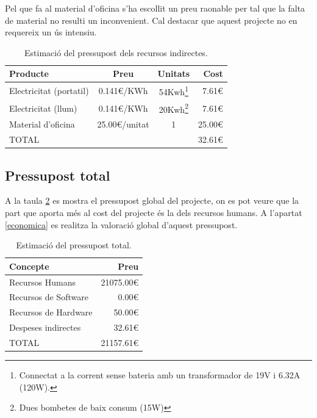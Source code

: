 Pel que fa al material d'oficina s'ha escollit un preu raonable per tal que la falta de material no resulti un inconvenient. Cal destacar que aquest projecte no en requereix un ús intensiu.

\begin{table}[!htb]
    \centering
    \begin{tabular}{|l||c|c|r|}
        \hline
         Producte & Preu & Unitats & Cost \\
         \hline\hline
         Electricitat (portatil) & 0.141€/KWh & 54Kwh\footnote{Connectat a la corrent sense bateria amb un transformador de 19V i 6.32A (120W).} & 7.61€\\
         \hline\hline
         Electricitat (llum) & 0.141€/KWh & 20Kwh\footnote{Dues bombetes de baix consum (15W)} & 7.61€\\
         \hline\hline
         Material d'oficina & 25.00€/unitat & 1 & 25.00€ \\
         \hline\hline
         TOTAL & & & 32.61€ \\
         \hline
    \end{tabular}
    \caption{Estimació del pressupost dels recursos indirectes.}
    \label{tab:recursos_indirectes}
\end{table}


\subsection{Pressupost total}

A la taula \ref{tab:total} es mostra el pressupost global del projecte, on es pot veure que la part que aporta més al cost del projecte és la dels recursos humans. A l'apartat \ref{economica} es realitza la valoració global d'aquest pressupost.

\begin{table}[!htb]
    \centering
    \begin{tabular}{|l|r|}
        \hline
         Concepte & Preu \\
         \hline\hline
         Recursos Humans & 21075.00€ \\
         Recursos de Software & 0.00€ \\
         Recursos de Hardware & 50.00€ \\
         Despeses indirectes & 32.61€ \\
         \hline\hline
         TOTAL & 21157.61€ \\
         \hline
    \end{tabular}
    \caption{Estimació del pressupost total.}
    \label{tab:total}
\end{table}

